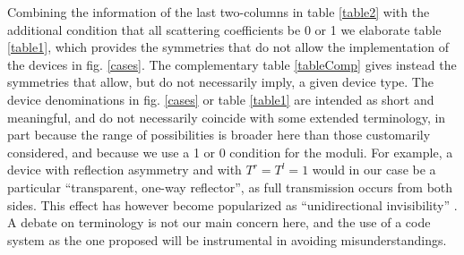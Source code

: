 Combining the information of the last two-columns in table \ref{table2} with the additional condition that all scattering coefficients
be 0 or 1 we elaborate table \ref{table1}, which provides
the symmetries
that do not allow the implementation of the devices in fig. \ref{cases}.
The complementary table \ref{tableComp} gives instead the symmetries that allow, but do not necessarily imply,
a given device type.
The device denominations in fig. \ref{cases} or table \ref{table1} are intended as short and meaningful, and do not necessarily coincide with
some extended terminology, in part because the range of possibilities is broader here than those customarily considered, and because we
use a 1 or 0 condition for the moduli.
For example, a device with reflection asymmetry and with $T^r=T^l=1$ would in our case be a particular
``transparent, one-way reflector'', as full transmission occurs from both sides.
This effect has however become popularized as ``unidirectional invisibility'' \cite{Lin2011,Yin2013}.
A debate on terminology is not our main concern here, and the use of a code system
as the one proposed will be instrumental in avoiding misunderstandings.


